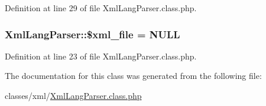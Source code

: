 Definition at line 29 of file Xml\+Lang\+Parser.\+class.\+php.

\subsubsection[{\texorpdfstring{\$xml\+\_\+file}{$xml_file}}]{\setlength{\rightskip}{0pt plus 5cm}Xml\+Lang\+Parser\+::\$xml\+\_\+file = N\+U\+LL}\hypertarget{classXmlLangParser_a95de36282488ee37a0ef18ef85a6697c}{}\label{classXmlLangParser_a95de36282488ee37a0ef18ef85a6697c}


Definition at line 23 of file Xml\+Lang\+Parser.\+class.\+php.



The documentation for this class was generated from the following file\+:\begin{DoxyCompactItemize}
\item 
classes/xml/\hyperlink{XmlLangParser_8class_8php}{Xml\+Lang\+Parser.\+class.\+php}\end{DoxyCompactItemize}
